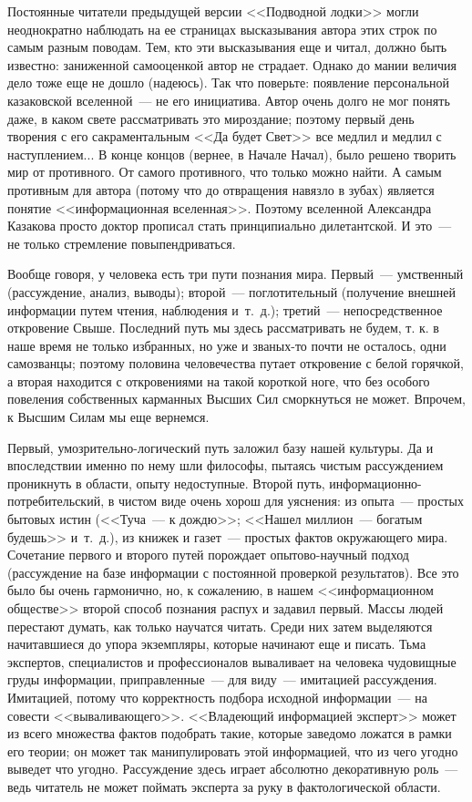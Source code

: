 \documentclass{scrbook}
\newcommand{\flqq}{<<}
\newcommand{\frqq}{>>}
\newcommand{\mdash}{~--- }
\begin{document}
Постоянные читатели предыдущей версии {\flqq}Подводной лодки{\frqq} могли неоднократно наблюдать на ее страницах высказывания автора этих строк по самым разным поводам. Тем, кто эти высказывания еще и читал, должно быть известно: заниженной самооценкой автор не страдает. Однако до мании величия дело тоже еще не дошло (надеюсь).
Так что поверьте: появление персональной казаковской вселенной{\mdash}не его инициатива. Автор очень долго не мог понять даже, в каком свете рассматривать это мироздание; поэтому первый день творения с его сакраментальным {\flqq}Да будет Свет{\frqq} все медлил и медлил с наступлением... В конце концов (вернее, в Начале Начал), было решено творить мир от противного. От самого противного, что только можно найти. А самым противным для автора (потому что до отвращения навязло в зубах) является понятие {\flqq}информационная вселенная{\frqq}. Поэтому вселенной Александра Казакова просто доктор прописал стать принципиально дилетантской. И это{\mdash}не только стремление повыпендриваться.

Вообще говоря, у человека есть три пути познания мира. Первый{\mdash}умственный (рассуждение, анализ, выводы); второй{\mdash}поглотительный (получение внешней информации путем чтения, наблюдения и~т.~д.); третий{\mdash}непосредственное откровение Свыше. Последний путь мы здесь рассматривать не будем, т. к. в наше время не только избранных, но уже и званых-то почти не осталось, одни самозванцы; поэтому половина человечества путает откровение с белой горячкой, а вторая находится с откровениями на такой короткой ноге, что без особого повеления собственных карманных Высших Сил сморкнуться не может. Впрочем, к Высшим Силам мы еще вернемся.

Первый, умозрительно-логический путь заложил базу нашей культуры. Да и впоследствии именно по нему шли философы, пытаясь чистым рассуждением проникнуть в области, опыту недоступные. Второй путь, информационно-потребительский, в чистом виде очень хорош для уяснения: из опыта{\mdash}простых бытовых истин ({\flqq}Туча{\mdash}к дождю{\frqq}; {\flqq}Нашел миллион{\mdash}богатым будешь{\frqq} и~т.~д.), из книжек и газет{\mdash}простых фактов окружающего мира. Сочетание первого и второго путей порождает опытово-научный подход (рассуждение на базе информации с постоянной проверкой результатов). Все это было бы очень гармонично, но, к сожалению, в нашем {\flqq}информационном обществе{\frqq} второй способ познания распух и задавил первый. Массы людей перестают думать, как только научатся читать. Среди них затем выделяются начитавшиеся до упора экземпляры, которые начинают еще и писать. Тьма экспертов, специалистов и профессионалов вываливает на человека чудовищные груды информации, приправленные{\mdash}для виду{\mdash}имитацией рассуждения. Имитацией, потому что корректность подбора исходной информации{\mdash}на совести {\flqq}вываливающего{\frqq}. {\flqq}Владеющий информацией эксперт{\frqq} может из всего множества фактов подобрать такие, которые заведомо ложатся в рамки его теории; он может так манипулировать этой информацией, что из чего угодно выведет что угодно. Рассуждение здесь играет абсолютно декоративную роль{\mdash}ведь читатель не может поймать эксперта за руку в фактологической области.
\end{document}
